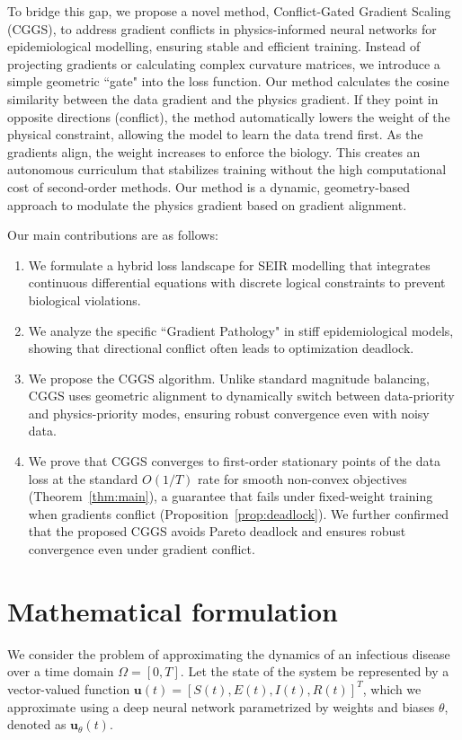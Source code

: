 \documentclass[11pt]{article}
\begin{document}
To bridge this gap, we propose a novel method, Conflict-Gated Gradient Scaling (CGGS), to address gradient conflicts in physics-informed neural networks for epidemiological modelling, ensuring stable and efficient training. Instead of projecting gradients or calculating complex curvature matrices, we introduce a simple geometric ``gate" into the loss function. Our method calculates the cosine similarity between the data gradient and the physics gradient. If they point in opposite directions (conflict), the method automatically lowers the weight of the physical constraint, allowing the model to learn the data trend first. As the gradients align, the weight increases to enforce the biology. This creates an autonomous curriculum that stabilizes training without the high computational cost of second-order methods. Our method is a dynamic, geometry-based approach to modulate the physics gradient based on gradient alignment.

Our main contributions are as follows:
\begin{enumerate}
    \item We formulate a hybrid loss landscape for SEIR modelling that integrates continuous differential equations with discrete logical constraints to prevent biological violations.
    \item We analyze the specific ``Gradient Pathology" in stiff epidemiological models, showing that directional conflict often leads to optimization deadlock.
    \item We propose the CGGS algorithm. Unlike standard magnitude balancing, CGGS uses geometric alignment to dynamically switch between data-priority and physics-priority modes, ensuring robust convergence even with noisy data.
    \item We prove that CGGS converges to first-order stationary points of the data loss at the standard $O(1/T)$ rate for smooth non-convex objectives (Theorem~\ref{thm:main}), a guarantee that fails under fixed-weight training when gradients conflict (Proposition~\ref{prop:deadlock}). We further confirmed that the proposed CGGS avoids Pareto deadlock and ensures robust convergence even under gradient conflict. 
\end{enumerate}


\section{Mathematical formulation}

We consider the problem of approximating the dynamics of an infectious disease over a time domain $\Omega = [0, T]$. Let the state of the system be represented by a vector-valued function $\mathbf{u}(t) = [S(t), E(t), I(t), R(t)]^T$, which we approximate using a deep neural network parametrized by weights and biases $\theta$, denoted as $\mathbf{u}_\theta(t)$.
\end{document}
